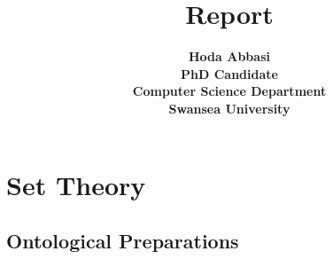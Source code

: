 \documentclass[12pt]{book}
\begin{document}
\title{\bf \Huge Report}

\author{ \bf Hoda Abbasi\\
 PhD Candidate\\
 Computer Science Department\\
Swansea University\\
}
\maketitle
\tableofcontents



\chapter{Set Theory}
\label{cha:settheory}

\section{Ontological Preparations}
\end{document}

